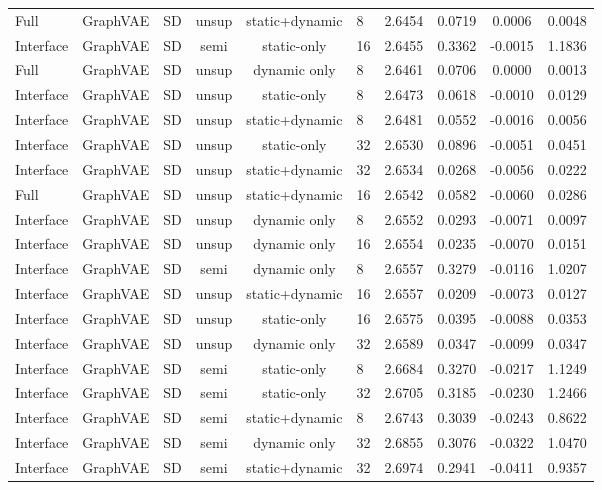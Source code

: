 \begin{landscape}
\begin{longtable}{llccclcccc}
Full & GraphVAE & SD & unsup & static+dynamic & 8 & 2.6454 & 0.0719 & 0.0006 & 0.0048 \\
Interface & GraphVAE & SD & semi & static-only & 16 & 2.6455 & 0.3362 & -0.0015 & 1.1836 \\
Full & GraphVAE & SD & unsup & dynamic only & 8 & 2.6461 & 0.0706 & 0.0000 & 0.0013 \\
Interface & GraphVAE & SD & unsup & static-only & 8 & 2.6473 & 0.0618 & -0.0010 & 0.0129 \\
Interface & GraphVAE & SD & unsup & static+dynamic & 8 & 2.6481 & 0.0552 & -0.0016 & 0.0056 \\
Interface & GraphVAE & SD & unsup & static-only & 32 & 2.6530 & 0.0896 & -0.0051 & 0.0451 \\
Interface & GraphVAE & SD & unsup & static+dynamic & 32 & 2.6534 & 0.0268 & -0.0056 & 0.0222 \\
Full & GraphVAE & SD & unsup & static+dynamic & 16 & 2.6542 & 0.0582 & -0.0060 & 0.0286 \\
Interface & GraphVAE & SD & unsup & dynamic only & 8 & 2.6552 & 0.0293 & -0.0071 & 0.0097 \\
Interface & GraphVAE & SD & unsup & dynamic only & 16 & 2.6554 & 0.0235 & -0.0070 & 0.0151 \\
Interface & GraphVAE & SD & semi & dynamic only & 8 & 2.6557 & 0.3279 & -0.0116 & 1.0207 \\
Interface & GraphVAE & SD & unsup & static+dynamic & 16 & 2.6557 & 0.0209 & -0.0073 & 0.0127 \\
Interface & GraphVAE & SD & unsup & static-only & 16 & 2.6575 & 0.0395 & -0.0088 & 0.0353 \\
Interface & GraphVAE & SD & unsup & dynamic only & 32 & 2.6589 & 0.0347 & -0.0099 & 0.0347 \\
Interface & GraphVAE & SD & semi & static-only & 8 & 2.6684 & 0.3270 & -0.0217 & 1.1249 \\
Interface & GraphVAE & SD & semi & static-only & 32 & 2.6705 & 0.3185 & -0.0230 & 1.2466 \\
Interface & GraphVAE & SD & semi & static+dynamic & 8 & 2.6743 & 0.3039 & -0.0243 & 0.8622 \\
Interface & GraphVAE & SD & semi & dynamic only & 32 & 2.6855 & 0.3076 & -0.0322 & 1.0470 \\
Interface & GraphVAE & SD & semi & static+dynamic & 32 & 2.6974 & 0.2941 & -0.0411 & 0.9357 \\
\hline
\end{longtable}
\end{landscape}
